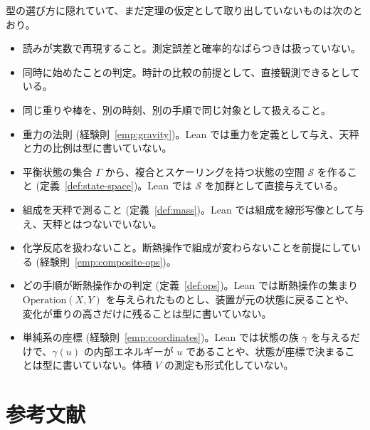 型の選び方に隠れていて、まだ定理の仮定として取り出していないものは次のとおり。
\begin{itemize}
  \item 読みが実数で再現すること。測定誤差と確率的なばらつきは扱っていない。
  \item 同時に始めたことの判定。時計の比較の前提として、直接観測できるとしている。
  \item 同じ重りや棒を、別の時刻、別の手順で同じ対象として扱えること。
  \item 重力の法則 (経験則~\ref{emp:gravity})。Lean では重力を定義として与え、天秤と力の比例は型に書いていない。
  \item 平衡状態の集合 $\Gamma$ から、複合とスケーリングを持つ状態の空間 $\mathcal{S}$ を作ること (定義~\ref{def:state-space})。Lean では $\mathcal{S}$ を加群として直接与えている。
  \item 組成を天秤で測ること (定義~\ref{def:mass})。Lean では組成を線形写像として与え、天秤とはつないでいない。
  \item 化学反応を扱わないこと。断熱操作で組成が変わらないことを前提にしている (経験則~\ref{emp:composite-ops})。
  \item どの手順が断熱操作かの判定 (定義~\ref{def:ops})。Lean では断熱操作の集まり $\mathrm{Operation}(X, Y)$ を与えられたものとし、装置が元の状態に戻ることや、変化が重りの高さだけに残ることは型に書いていない。
  \item 単純系の座標 (経験則~\ref{emp:coordinates})。Lean では状態の族 $\gamma$ を与えるだけで、$\gamma(u)$ の内部エネルギーが $u$ であることや、状態が座標で決まることは型に書いていない。体積 $V$ の測定も形式化していない。
\end{itemize}

\chapter{参考文献}

